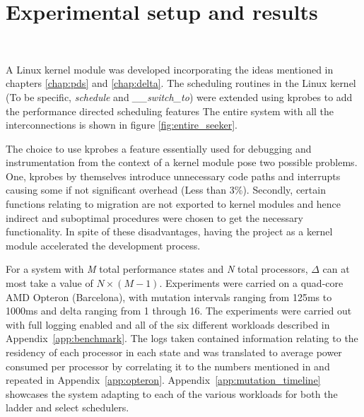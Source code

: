 \chapter{Experimental setup and results}~\label{chap:results}

A Linux kernel module was developed incorporating the ideas mentioned in chapters \ref{chap:pds}
and \ref{chap:delta}. The scheduling routines in the Linux kernel (To be specific, \textit{schedule} and \textit{\_\_switch\_to})
were extended using kprobes \cite{kprobes} to add the performance directed scheduling features
The entire system with all the interconnections is shown in figure \ref{fig:entire_seeker}.

The choice to use kprobes \cite{kprobes} a feature essentially used for debugging and instrumentation
from the context of a kernel module pose two possible 
problems. One, kprobes by themselves introduce unnecessary code paths and interrupts causing some
if not significant overhead (Less than 3\%). Secondly, certain functions relating to migration are not exported
to kernel modules and hence indirect and suboptimal procedures were chosen to get the necessary 
functionality. In spite of these disadvantages, having the project as a kernel module accelerated 
the development process. 

For a system with \textit{M} total performance states and \textit{N} total processors, $\Delta$ can 
at most take a value of $N \times (M-1)$. Experiments were carried on a quad-core AMD Opteron (Barcelona),
with mutation intervals ranging from 125ms to 1000ms and delta ranging from 1 through 16. The experiments
were carried out with full logging enabled and all of the six different workloads described in Appendix~\ref{app:benchmark}. 
The logs taken contained information relating to the residency of each processor in each state and was 
translated to average power consumed per processor by correlating it to the numbers mentioned in \cite{AMDPow} and
repeated in Appendix~\ref{app:opteron}. Appendix~\ref{app:mutation_timeline} showcases the system adapting to
each of the various workloads for both the ladder and select schedulers.


